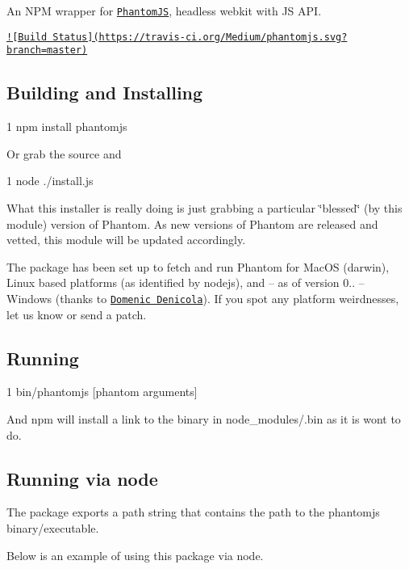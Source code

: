 An N\+P\+M wrapper for \href{http://phantomjs.org/}{\tt Phantom\+J\+S}, headless webkit with J\+S A\+P\+I.

\href{https://travis-ci.org/Medium/phantomjs}{\tt !\mbox{[}Build Status\mbox{]}(https\+://travis-\/ci.\+org/\+Medium/phantomjs.\+svg?branch=master)}

\subsection*{Building and Installing }


\begin{DoxyCode}
1 npm install phantomjs
\end{DoxyCode}


Or grab the source and


\begin{DoxyCode}
1 node ./install.js
\end{DoxyCode}


What this installer is really doing is just grabbing a particular \char`\"{}blessed\char`\"{} (by this module) version of Phantom. As new versions of Phantom are released and vetted, this module will be updated accordingly.

The package has been set up to fetch and run Phantom for Mac\+O\+S (darwin), Linux based platforms (as identified by nodejs), and -- as of version 0.. -- Windows (thanks to \href{https://github.com/domenic}{\tt Domenic Denicola}). If you spot any platform weirdnesses, let us know or send a patch.

\subsection*{Running }


\begin{DoxyCode}
1 bin/phantomjs [phantom arguments]
\end{DoxyCode}


And npm will install a link to the binary in {\ttfamily node\+\_\+modules/.bin} as it is wont to do.

\subsection*{Running via node }

The package exports a {\ttfamily path} string that contains the path to the phantomjs binary/executable.

Below is an example of using this package via node.


